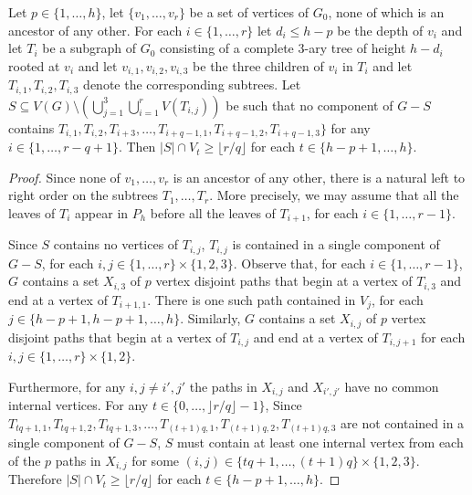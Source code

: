 \documentclass{patmorin}
\begin{document}
\begin{lem}\label{subtree_splitting}
  Let $p\in\{1,\ldots,h\}$, let $\{v_1,\ldots,v_r\}$ be a set of vertices of $G_0$, none of which is an ancestor of any other.  For each $i\in\{1,\ldots,r\}$ let $d_i\le h-p$ be the depth of $v_i$ and let $T_i$ be a subgraph of $G_0$ consisting of a complete $3$-ary tree of height $h-d_i$ rooted at $v_i$ and let $v_{i,1},v_{i,2},v_{i,3}$ be the three children of $v_i$ in $T_i$ and let $T_{i,1},T_{i,2},T_{i,3}$ denote the corresponding subtrees.  Let $S\subseteq V(G)\setminus(\bigcup_{j=1}^3\bigcup_{i=1}^r V(T_{i,j}))$ be such that no component of $G-S$ contains $T_{i,1},T_{i,2},T_{i+3},\ldots,T_{i+q-1,1},T_{i+q-1,2},T_{i+q-1,3}\}$ for any $i\in\{1,\ldots,r-q+1\}$.  Then $|S|\cap V_t\ge \lfloor r/q\rfloor$ for each $t\in\{h-p+1,\ldots,h\}$.
\end{lem}

\begin{proof}
  Since none of $v_1,\ldots,v_r$ is an ancestor of any other, there is a natural left to right order on the subtrees $T_1,\ldots,T_r$. More precisely, we may assume that all the leaves of $T_i$ appear in $P_h$ before all the leaves of $T_{i+1}$, for each $i\in\{1,\ldots,r-1\}$.

  Since $S$ contains no vertices of $T_{i,j}$, $T_{i,j}$ is contained in a single component of $G-S$, for each $i,j\in\{1,\ldots,r\}\times\{1,2,3\}$.   Observe that, for each $i\in\{1,\ldots,r-1\}$, $G$ contains a set $X_{i,3}$ of $p$ vertex disjoint paths that begin at a vertex of $T_{i,3}$ and end at a vertex of $T_{i+1,1}$. There is one such path contained in $V_j$, for each $j\in\{h-p+1,h-p+1,\ldots,h\}$.  Similarly, $G$ contains a set $X_{i,j}$ of $p$ vertex disjoint paths that begin at a vertex of $T_{i,j}$ and end at a vertex of $T_{i,j+1}$ for each $i,j\in\{1,\ldots,r\}\times\{1,2\}$.  

  Furthermore, for any $i,j\neq i',j'$ the paths in $X_{i,j}$ and $X_{i',j'}$ have no common internal vertices.  For any $t\in\{0,\ldots,\rfloor r/q\rfloor-1\}$, Since $T_{tq+1,1},T_{tq+1,2},T_{tq+1,3},\ldots,T_{(t+1)q,1},T_{(t+1)q,2},T_{(t+1)q,3}$ are not contained in a single component of $G-S$, $S$ must contain at least one internal vertex from each of the $p$ paths in $X_{i,j}$ for some $(i,j)\in\{tq+1,\ldots,(t+1)q\}\times\{1,2,3\}$.  Therefore $|S|\cap V_t\ge \lfloor r/q\rfloor$ for each $t\in\{h-p+1,\ldots,h\}$.
\end{proof}
\end{document}
